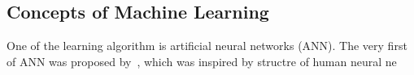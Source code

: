 \subsection{Concepts of Machine Learning}
One of the learning algorithm is artificial neural networks (ANN). The very first of ANN was proposed by~\citet{McCulloch_1943}, which was inspired by structre of human neural ne
